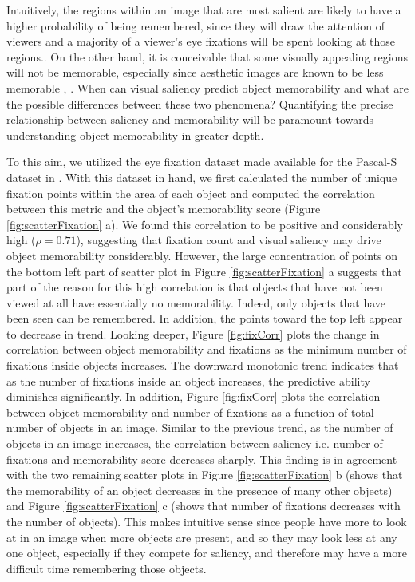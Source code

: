 Intuitively, the regions within an image that are most salient are likely to have a higher probability of being remembered, since they will draw the attention of viewers and a majority of a viewer’s eye fixations will be spent looking at those regions.. On the other hand, it is conceivable that some visually appealing regions will not be memorable, especially since aesthetic images are known to be less memorable \cite{isola11}, \cite{isola14}. When can visual saliency predict object memorability and what are the possible differences between these two phenomena? Quantifying the precise relationship between saliency and memorability will be paramount  towards understanding object memorability in greater depth.

To this aim, we utilized the eye fixation dataset made available for the Pascal-S dataset in \cite{yin14}. With this dataset in hand, we first calculated the number of unique fixation points within the area of each object and computed the correlation between this metric and the object’s memorability score (Figure \ref{fig:scatterFixation} a). We found this correlation to be positive and considerably high ($\rho = 0.71$), suggesting that fixation count and visual saliency may drive object memorability considerably. However, the large concentration of points on the bottom left part of scatter plot in Figure \ref{fig:scatterFixation} a suggests that part of the reason for this high correlation is that objects that have not been viewed at all have essentially no memorability. Indeed, only objects that have been seen can be remembered. In addition, the points toward the top left appear to decrease in trend. Looking deeper, Figure \ref{fig:fixCorr} plots the change in correlation between object memorability and fixations as the minimum number of fixations inside objects increases. The downward monotonic trend indicates that as the number of fixations inside an object increases, the predictive ability diminishes significantly. In addition, Figure \ref{fig:fixCorr} plots the correlation between object memorability and number of fixations as a function of total number of objects in an image. Similar to the previous trend, as the number of objects in an image increases, the correlation between saliency i.e. number of fixations and memorability score decreases sharply. This finding is in agreement with the two remaining scatter plots in Figure \ref{fig:scatterFixation} b (shows that the memorability of an object decreases in the presence of many other objects) and Figure \ref{fig:scatterFixation} c (shows that number of fixations decreases with the number of objects). This makes intuitive sense since people have more to look at in an image when more objects are present, and so they may look less at any one object, especially if they compete for saliency, and therefore may have a more difficult time remembering those objects.

